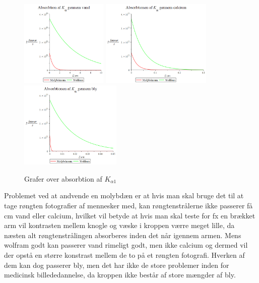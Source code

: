 \documentclass[a4paper,twoside]{article}
\begin{document}
\begin{figure}[H]
\begin{centering}
\includegraphics[height=4.15cm]{Absorbtion gennem vand.png}
\hspace{0.5cm}
\includegraphics[height=4.15cm]{Absorbtion gennem calcium.png}
\includegraphics[height=4.15cm]{Absorbtion gennem bly.png}
\par\end{centering}
\caption{\label{cap:2ien} Grafer over absorbtion af $K_{\alpha1}$ }
\end{figure}
Problemet ved at andvende en molybdæn er at hvis man skal bruge det til at tage røngten fotografier af mennesker med, kan røngtenstrålerne ikke passerer få cm vand eller calcium, hvilket vil betyde at hvis man skal teste for fx en brækket arm vil kontrasten mellem knogle og væske i kroppen værre meget lille, da næsten alt røngtenstrålingen absorberes inden det når igennem armen. Mens wolfram godt kan passerer vand rimeligt godt, men ikke calcium og dermed vil der opstå en større konstrast mellem de to på et røngten fotografi. Hverken af dem kan dog passerer bly, men det har ikke de store problemer inden for medicinsk billededannelse, da kroppen ikke består af store mængder af bly. 
\end{document}
